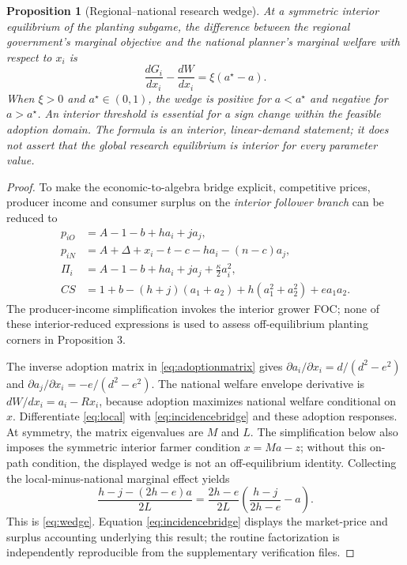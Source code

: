 \documentclass[11pt,a4paper]{article}
\newtheorem{proposition}{Proposition}
\begin{document}
\begin{proposition}[Regional--national research wedge]
At a symmetric interior equilibrium of the planting subgame, the difference between the regional government's marginal objective and the national planner's marginal welfare with respect to $x_i$ is
\begin{equation}
 \frac{dG_i}{dx_i}-\frac{dW}{dx_i}=\xi(a^\star-a).
 \label{eq:wedge}
\end{equation}
When $\xi>0$ and $a^\star\in(0,1)$, the wedge is positive for $a<a^\star$ and negative for $a>a^\star$. An interior threshold is essential for a sign change within the feasible adoption domain. The formula is an interior, linear-demand statement; it does not assert that the global research equilibrium is interior for every parameter value.
\end{proposition}
\begin{proof}
To make the economic-to-algebra bridge explicit, competitive prices, producer income and consumer surplus on the \emph{interior follower branch} can be reduced to
\begin{align}
p_{iO}&=A-1-b+h a_i+j a_j,\nonumber\\
p_{iN}&=A+\Delta+x_i-t-c-h a_i-(n-c)a_j,\nonumber\\
\Pi_i&=A-1-b+h a_i+j a_j+\frac{\kappa}{2}a_i^2,\nonumber\\
CS&=1+b-(h+j)(a_1+a_2)
+h(a_1^2+a_2^2)+e a_1a_2.
\label{eq:incidencebridge}
\end{align}
The producer-income simplification invokes the interior grower FOC; none of these interior-reduced expressions is used to assess off-equilibrium planting corners in Proposition 3.

The inverse adoption matrix in \eqref{eq:adoptionmatrix} gives $\partial a_i/\partial x_i=d/(d^2-e^2)$ and $\partial a_j/\partial x_i=-e/(d^2-e^2)$. The national welfare envelope derivative is $dW/dx_i=a_i-Rx_i$, because adoption maximizes national welfare conditional on $x$. Differentiate \eqref{eq:local} with \eqref{eq:incidencebridge} and these adoption responses. At symmetry, the matrix eigenvalues are $M$ and $L$. The simplification below also imposes the symmetric interior farmer condition $x=Ma-z$; without this on-path condition, the displayed wedge is not an off-equilibrium identity. Collecting the local-minus-national marginal effect yields
\[
 \frac{h-j-(2h-e)a}{2L}
 =\frac{2h-e}{2L}\left(\frac{h-j}{2h-e}-a\right).
\]
This is \eqref{eq:wedge}. Equation \eqref{eq:incidencebridge} displays the market-price and surplus accounting underlying this result; the routine factorization is independently reproducible from the supplementary verification files.
\end{proof}
\end{document}
